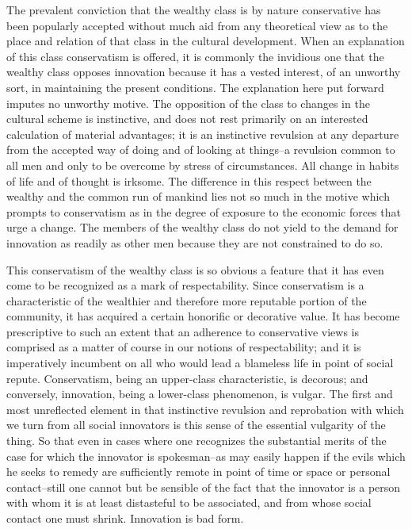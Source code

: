 \documentclass[12pt]{report}
\begin{document}
The prevalent conviction that the wealthy class is by nature
conservative has been popularly accepted without much aid from any
theoretical view as to the place and relation of that class in the
cultural development. When an explanation of this class conservatism is
offered, it is commonly the invidious one that the wealthy class opposes
innovation because it has a vested interest, of an unworthy sort, in
maintaining the present conditions. The explanation here put forward
imputes no unworthy motive. The opposition of the class to changes in
the cultural scheme is instinctive, and does not rest primarily on an
interested calculation of material advantages; it is an instinctive
revulsion at any departure from the accepted way of doing and of looking
at things--a revulsion common to all men and only to be overcome by
stress of circumstances. All change in habits of life and of thought
is irksome. The difference in this respect between the wealthy and the
common run of mankind lies not so much in the motive which prompts to
conservatism as in the degree of exposure to the economic forces that
urge a change. The members of the wealthy class do not yield to the
demand for innovation as readily as other men because they are not
constrained to do so.

This conservatism of the wealthy class is so obvious a feature that
it has even come to be recognized as a mark of respectability. Since
conservatism is a characteristic of the wealthier and therefore more
reputable portion of the community, it has acquired a certain honorific
or decorative value. It has become prescriptive to such an extent that
an adherence to conservative views is comprised as a matter of course in
our notions of respectability; and it is imperatively incumbent on all
who would lead a blameless life in point of social repute. Conservatism,
being an upper-class characteristic, is decorous; and conversely,
innovation, being a lower-class phenomenon, is vulgar. The first and
most unreflected element in that instinctive revulsion and reprobation
with which we turn from all social innovators is this sense of the
essential vulgarity of the thing. So that even in cases where one
recognizes the substantial merits of the case for which the innovator
is spokesman--as may easily happen if the evils which he seeks to
remedy are sufficiently remote in point of time or space or personal
contact--still one cannot but be sensible of the fact that the innovator
is a person with whom it is at least distasteful to be associated, and
from whose social contact one must shrink. Innovation is bad form.
\end{document}

